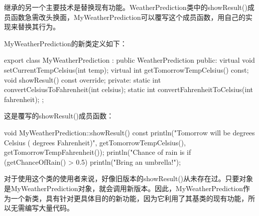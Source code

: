 
继承的另一个主要技术是替换现有功能。WeatherPrediction类中的showResult()成员函数急需改头换面，MyWeatherPrediction可以覆写这个成员函数，用自己的实现来替换其行为。

MyWeatherPrediction的新类定义如下：

\begin{cpp}
export class MyWeatherPrediction : public WeatherPrediction
{
    public:
        virtual void setCurrentTempCelsius(int temp);
        virtual int getTomorrowTempCelsius() const;
        void showResult() const override;
    private:
        static int convertCelsiusToFahrenheit(int celsius);
        static int convertFahrenheitToCelsius(int fahrenheit);
};
\end{cpp}

这是覆写的showResult()成员函数：

\begin{cpp}
void MyWeatherPrediction::showResult() const
{
    println("Tomorrow will be {} degrees Celsius ({} degrees Fahrenheit)",
        getTomorrowTempCelsius(), getTomorrowTempFahrenheit());
    println("Chance of rain is {}%
    if (getChanceOfRain() > 0.5) { println("Bring an umbrella!"); }
}
\end{cpp}

对于使用这个类的使用者来说，好像旧版本的showResult()从未存在过。只要对象是MyWeatherPrediction对象，就会调用新版本。因此，MyWeatherPrediction作为一个新类，具有针对更具体目的的新功能，因为它利用了其基类的现有功能，所以无需编写大量代码。






